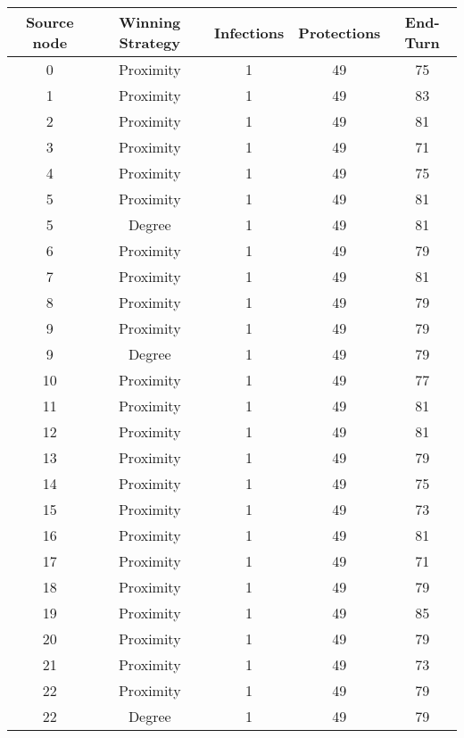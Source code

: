 \documentclass[results.tex]{subfiles}
\begin{document}
\begin{center}
  \begin{tabular}{| c || c | c | c | c |}
    \hline
    {\bfseries Source node} & {\bfseries Winning Strategy} & {\bfseries Infections} & {\bfseries Protections} & {\bfseries End-Turn} \\  %
    \hline\hline
    0 & Proximity & 1 & 49 & 75 \\ 
    \hline
    1 & Proximity & 1 & 49 & 83 \\ 
    \hline
    2 & Proximity & 1 & 49 & 81 \\ 
    \hline
    3 & Proximity & 1 & 49 & 71 \\ 
    \hline
    4 & Proximity & 1 & 49 & 75 \\ 
    \hline
    5 & Proximity & 1 & 49 & 81 \\ 
    \hline
    5 & Degree & 1 & 49 & 81 \\ 
    \hline
    6 & Proximity & 1 & 49 & 79 \\ 
    \hline
    7 & Proximity & 1 & 49 & 81 \\ 
    \hline
    8 & Proximity & 1 & 49 & 79 \\ 
    \hline
    9 & Proximity & 1 & 49 & 79 \\ 
    \hline
    9 & Degree & 1 & 49 & 79 \\ 
    \hline
    10 & Proximity & 1 & 49 & 77 \\ 
    \hline
    11 & Proximity & 1 & 49 & 81 \\ 
    \hline
    12 & Proximity & 1 & 49 & 81 \\ 
    \hline
    13 & Proximity & 1 & 49 & 79 \\ 
    \hline
    14 & Proximity & 1 & 49 & 75 \\ 
    \hline
    15 & Proximity & 1 & 49 & 73 \\ 
    \hline
    16 & Proximity & 1 & 49 & 81 \\ 
    \hline
    17 & Proximity & 1 & 49 & 71 \\ 
    \hline
    18 & Proximity & 1 & 49 & 79 \\ 
    \hline
    19 & Proximity & 1 & 49 & 85 \\ 
    \hline
    20 & Proximity & 1 & 49 & 79 \\ 
    \hline
    21 & Proximity & 1 & 49 & 73 \\ 
    \hline
    22 & Proximity & 1 & 49 & 79 \\ 
    \hline
    22 & Degree & 1 & 49 & 79 \\ 

\end{tabular}
\end{center}
\end{document}
